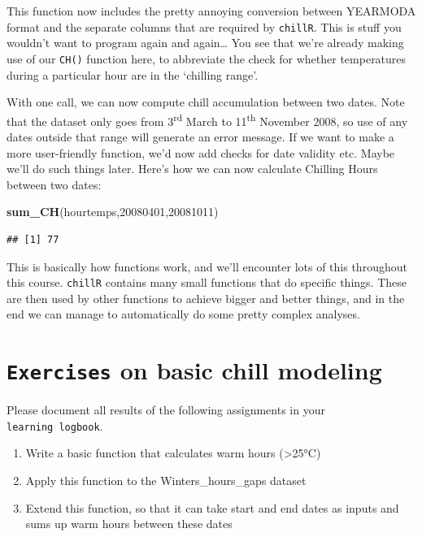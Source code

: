 \documentclass[
]{book}
\newenvironment{Shaded}{\begin{snugshade}}{\end{snugshade}}
\newcommand{\DecValTok}[1]{\textcolor[rgb]{0.00,0.00,0.81}{#1}}
\newcommand{\KeywordTok}[1]{\textcolor[rgb]{0.13,0.29,0.53}{\textbf{#1}}}
\newcommand{\NormalTok}[1]{#1}
\providecommand{\tightlist}{%
  \setlength{\itemsep}{0pt}\setlength{\parskip}{0pt}}
\begin{document}
This function now includes the pretty annoying conversion between YEARMODA format and the separate columns that are required by \texttt{chillR}. This is stuff you wouldn't want to program again and again\ldots{} You see that we're already making use of our \texttt{CH()} function here, to abbreviate the check for whether temperatures during a particular hour are in the `chilling range'.

With one call, we can now compute chill accumulation between two dates. Note that the dataset only goes from 3\textsuperscript{rd} March to 11\textsuperscript{th} November 2008, so use of any dates outside that range will generate an error message. If we want to make a more user-friendly function, we'd now add checks for date validity etc. Maybe we'll do such things later. Here's how we can now calculate Chilling Hours between two dates:

\begin{Shaded}
\begin{Highlighting}[]
\KeywordTok{sum_CH}\NormalTok{(hourtemps,}\DecValTok{20080401}\NormalTok{,}\DecValTok{20081011}\NormalTok{)}
\end{Highlighting}
\end{Shaded}

\begin{verbatim}
## [1] 77
\end{verbatim}

This is basically how functions work, and we'll encounter lots of this throughout this course. \texttt{chillR} contains many small functions that do specific things. These are then used by other functions to achieve bigger and better things, and in the end we can manage to automatically do some pretty complex analyses.

\hypertarget{exercises_manual_chill_analysis}{%
\section*{\texorpdfstring{\texttt{Exercises} on basic chill modeling}{Exercises on basic chill modeling}}\label{exercises_manual_chill_analysis}}

Please document all results of the following assignments in your \texttt{learning\ logbook}.

\begin{enumerate}
\def\labelenumi{\arabic{enumi})}
\tightlist
\item
  Write a basic function that calculates warm hours (\textgreater25°C)
\item
  Apply this function to the Winters\_hours\_gaps dataset
\item
  Extend this function, so that it can take start and end dates as inputs and sums up warm hours between these dates
\end{enumerate}
\end{document}
